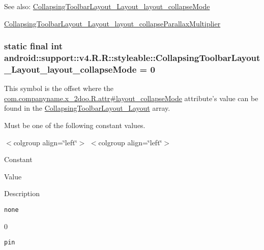\begin{Desc}
\item[See also:]\hyperlink{classandroid_1_1support_1_1v4_1_1_r_1_1styleable_0a4d753a9146e42fa452216511bb60bd}{CollapsingToolbarLayout\_\-Layout\_\-layout\_\-collapseMode} 

\hyperlink{classandroid_1_1support_1_1v4_1_1_r_1_1styleable_d364fcfe501be0099ffef1f05abd61c9}{CollapsingToolbarLayout\_\-Layout\_\-layout\_\-collapseParallaxMultiplier} \end{Desc}
\hypertarget{classandroid_1_1support_1_1v4_1_1_r_1_1styleable_0a4d753a9146e42fa452216511bb60bd}{
\subsubsection[{CollapsingToolbarLayout\_\-Layout\_\-layout\_\-collapseMode}]{\setlength{\rightskip}{0pt plus 5cm}static final int android::support::v4.R.R::styleable::CollapsingToolbarLayout\_\-Layout\_\-layout\_\-collapseMode = 0}}
\label{classandroid_1_1support_1_1v4_1_1_r_1_1styleable_0a4d753a9146e42fa452216511bb60bd}


This symbol is the offset where the \hyperlink{classcom_1_1companyname_1_1x__2doo_1_1_r_1_1attr_d88df0ec745d345be0dff9888be8c389}{com.companyname.x\_\-2doo.R.attr\#layout\_\-collapseMode} attribute's value can be found in the \hyperlink{classandroid_1_1support_1_1v4_1_1_r_1_1styleable_6906c73a21feed9a1c451f787d6f3059}{CollapsingToolbarLayout\_\-Layout} array.

Must be one of the following constant values. \begin{TabularC}{0}
\hline
\end{TabularC}
$<$colgroup align=\char`\"{}left\char`\"{}$>$ $<$colgroup align=\char`\"{}left\char`\"{}$>$ 

Constant

Value

Description 

{\tt none}

0

{\tt pin}

